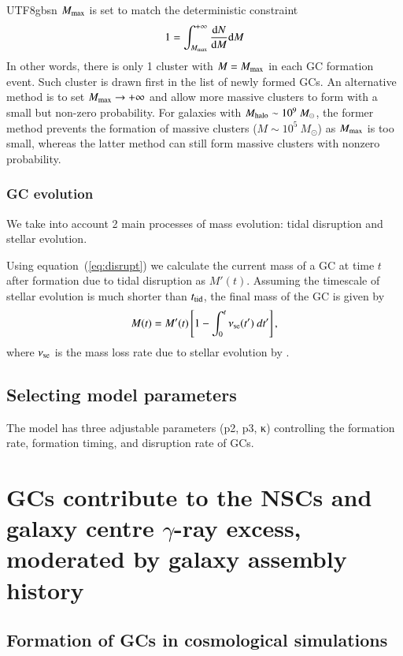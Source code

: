 \documentclass[trackchanges, twocolappendix, twocolumn]{aastex701}
\begin{document}
\begin{CJK*}{UTF8}{gbsn}
$M_{\rm max}$ is set to match the deterministic constraint
\begin{align}
1 = \int_{M_{\rm max}}^{+ \infty} \dfrac{\mathrm{d} N}{\mathrm{d} M} \mathrm{d} M
\label{eq:M_max}
\end{align}
In other words, there is only 1 cluster with $M = M_{\rm max}$ in each GC formation event. Such cluster is drawn first in the list of newly formed GCs. An alternative method is to set $M_{\rm max}\rightarrow + \infty$ and allow more massive clusters to form with a small but non-zero probability. For galaxies with $M_{\rm halo}\sim 10^9~M_\odot$, the former method prevents the formation of massive clusters ($M \sim 10^5~M_\odot$) as $M_{\rm max}$ is too small, whereas the latter method can still form massive clusters with nonzero probability.

\subsubsection{GC evolution} \label{subsubsect:evol}

We take into account 2 main processes of mass evolution: tidal disruption and stellar evolution.

Using equation~(\ref{eq:disrupt}) we calculate the current mass of a GC at time $t$ after formation due to tidal disruption as $M'(t)$. Assuming the timescale of stellar evolution is much shorter than $t_{\rm tid}$, the final mass of the GC is given by
\begin{align}
	M(t) = M'(t)\left[1-\int_0^t\nu_{\rm se}(t')\ dt'\right],
	\label{eq:stellaR_{\rm e}volution}
\end{align}
where $\nu_{\rm se}$ is the mass loss rate due to stellar evolution by \citet{prieto_dynamical_2008}.

\subsection{Selecting model parameters} \label{subsect:param}

The model has three adjustable parameters (p2, p3, κ) controlling the formation rate, formation timing, and disruption rate of GCs.

\section{GCs contribute to the NSCs and galaxy centre $\gamma$-ray excess, moderated by galaxy assembly history}

\subsection{Formation of GCs in cosmological simulations} \label{subsect:GC}


\end{CJK*}
\end{document}
